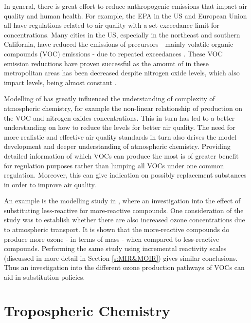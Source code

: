 In general, there is great effort to reduce anthropogenic emissions that impact air quality and human health. For example, the 
EPA in the US and European Union all have regulations related to air quality with a set exceedance limit for  
concentrations. Many cities in the US, especially in the northeast and southern California, have reduced the emissions of 
 precursors - mainly volatile organic compounds (VOC) emissions - due to repeated exceedances \citep{Fiore:1998}. These 
VOC emission reductions have proven successful as the amount of  in these metropolitan areas has been decreased despite 
nitrogen oxide levels, which also impact  levels, being almost constant \citep{Fiore:1998, Lin:2001}.

Modelling of  has greatly influenced the understanding of complexity of atmospheric chemistry, for example the 
non-linear relationship of  production on the VOC and nitrogen oxides concentrations. This in turn has led to a better 
understanding on how to reduce the  levels for better air quality. The need for more realistic and effective air quality
standards in turn also drives the model development and deeper understanding of atmospheric chemistry. Providing detailed 
information of which VOCs can produce the most  is of greater benefit for regulation purposes rather than lumping all 
VOCs under one common regulation. Moreover, this can give indication on possibly replacement substances in order to improve air
quality.

An example is the modelling study in \citep{Capps:2010}, where an investigation into the effect of substituting less-reactive 
for more-reactive compounds. One consideration of the study was to establish whether there are also increased ozone 
concentrations due to atmospheric transport. It is shown that the more-reactive compounds do produce more ozone - in terms of 
mass - when compared to less-reactive compounds. Performing the same study using incremental reactivity scales (discussed in 
more detail in Section \ref{s:MIR&MOIR}) gives similar conclusions. Thus an investigation into the different ozone production 
pathways of VOCs can aid in substitution policies.

\section{Tropospheric Chemistry} \label{s:atmo_chem}

